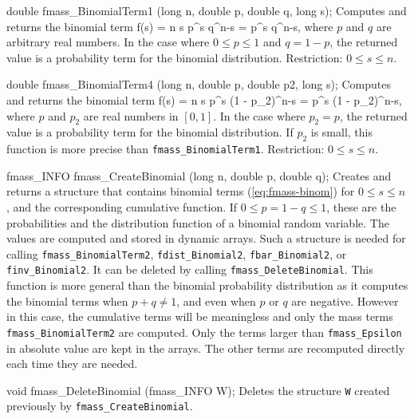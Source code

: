 double fmass_BinomialTerm1 (long n, double p, double q, long s);
\endcode
 \tab Computes and returns the binomial term
  \eq
     f(s) = {n \choose s} p^s q^{n-s} =
       \; p^s q^{n-s},       
  \endeq
  where $p$ and $q$ are arbitrary real numbers.
  In the case where $0 \le p \le 1$ and $q = 1-p$, the returned
  value is a probability term for the binomial distribution.
  Restriction: $0\le s\le n$.
  \endtab
\code


double fmass_BinomialTerm4 (long n, double p, double p2, long s);
\endcode
 \tab   Computes and returns the binomial term
  \eq
     f(s) = {n \choose s} p^s (1 - p_2)^{n-s} =
       \; p^s (1 - p_2)^{n-s},       
  \endeq
  where $p$ and $p_2$ are real numbers in $[0, 1]$.
  In the case where $p_2 = p$, the returned
  value is a probability term for the binomial distribution. If
  $p_2$ is small, this function is more precise than 
  {\tt fmass\_BinomialTerm1}.
  Restriction: $0\le s\le n$.
  \endtab
\code


fmass_INFO fmass_CreateBinomial (long n, double p, double q);
\endcode
  \tab Creates and returns a structure that contains binomial terms
   (\ref{eq:fmass-binom}) for $0\le s\le n$, and the corresponding 
   cumulative function.  If $0\le p = 1-q\le 1$, these are the probabilities
   and the distribution function of a binomial random variable.
   The values are computed and stored in dynamic arrays.
   Such a structure is needed for calling {\tt fmass\_BinomialTerm2},
   {\tt fdist\_Binomial2}, {\tt fbar\_Binomial2}, or {\tt finv\_Binomial2}.
   It can be deleted by calling {\tt fmass\_DeleteBinomial}.
   This function is more general than the binomial probability distribution
    as it computes the binomial terms when $p + q \not= 1$, and
  even when $p$ or $q$ are negative. However in this case, the cumulative
  terms will be meaningless and only the mass terms {\tt fmass\_BinomialTerm2}
  are computed.
  \ifdetailed %
  Only the terms larger than {\tt fmass\_Epsilon} in absolute value are kept
  in the arrays. The other terms are recomputed directly each time
   they are needed.
  \fi  %
 \endtab
\code


void fmass_DeleteBinomial (fmass_INFO W);
\endcode
 \tab Deletes the structure {\tt W} created previously 
   by {\tt fmass\_CreateBinomial}.
 \endtab
\code


